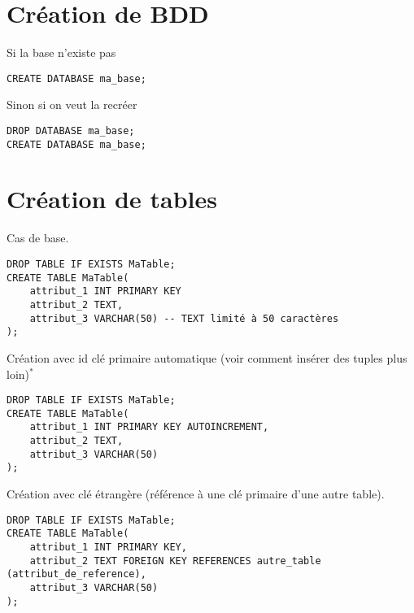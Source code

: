 \documentclass[a4paper,10pt,article]{nsi}
\begin{document}
\maketitle


\section*{Création de BDD}

Si la base n'existe pas
\begin{sql}
    \begin{verbatim}
CREATE DATABASE ma_base;
\end{verbatim}
\end{sql}

Sinon si on veut la recréer
\begin{sql}
    \begin{verbatim}
DROP DATABASE ma_base;
CREATE DATABASE ma_base;
\end{verbatim}
\end{sql}

\section*{Création de tables}

Cas de base.
\begin{sql}
    \begin{verbatim}
DROP TABLE IF EXISTS MaTable;
CREATE TABLE MaTable(
    attribut_1 INT PRIMARY KEY
    attribut_2 TEXT,
    attribut_3 VARCHAR(50) -- TEXT limité à 50 caractères
);
\end{verbatim}
\end{sql}

Création avec id clé primaire automatique (voir comment insérer des tuples plus loin)$^*$
\begin{sql}
    \begin{verbatim}
DROP TABLE IF EXISTS MaTable;
CREATE TABLE MaTable(
    attribut_1 INT PRIMARY KEY AUTOINCREMENT,
    attribut_2 TEXT,
    attribut_3 VARCHAR(50) 
);
\end{verbatim}
\end{sql}

Création avec clé étrangère (référence à une clé primaire d'une autre table).
\begin{sql}
    \begin{verbatim}
DROP TABLE IF EXISTS MaTable;
CREATE TABLE MaTable(
    attribut_1 INT PRIMARY KEY,
    attribut_2 TEXT FOREIGN KEY REFERENCES autre_table (attribut_de_reference),
    attribut_3 VARCHAR(50)
); 
\end{verbatim}
\end{sql}
\end{document}
